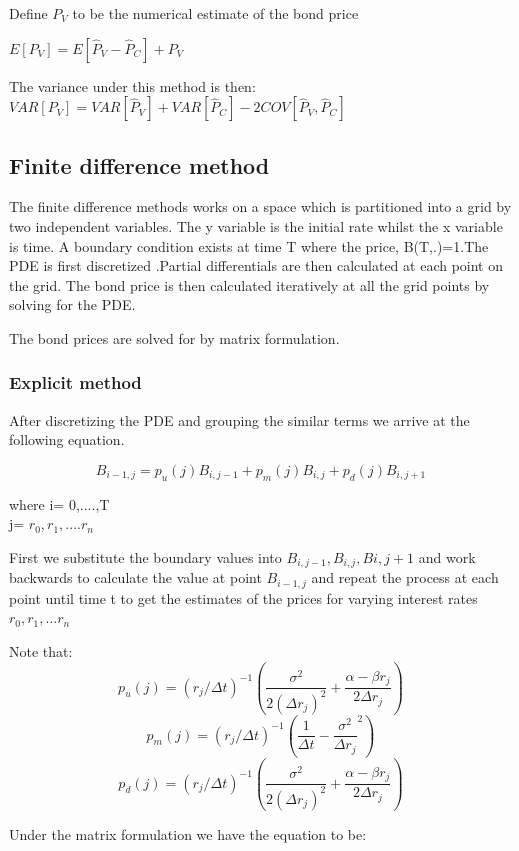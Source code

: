 \documentclass[12pt,a4paper]{article}
\begin{document}
Define $P_{V}$ to be the numerical estimate of the bond price

$E[P_{V}]=E[\hat{P}_{V}-\hat{P}_{C}]+P_{V} $

The variance under this method is then:  
\\$VAR[P_{V}]=VAR[\hat{P}_{V}]+VAR[\hat{P}_{C}]-2COV[\hat{P}_{V},\hat{P}_{C}]$ 


    
\subsection{Finite difference method}

The finite difference methods works on a space which is partitioned into a grid by two independent variables. The y variable is the initial rate whilst the x variable is time. A boundary condition exists at time T where the price, B(T,.)=1.The PDE is first discretized .Partial differentials are then calculated at each point on the grid. The bond price is then calculated iteratively at all the grid points by solving for the PDE.

The bond prices are solved for by matrix formulation.    


\subsubsection{Explicit method}

After discretizing the PDE and grouping the similar terms we arrive at the following equation.  

$$B_{i-1,j}=p_u(j)B_{i,j-1}+p_m(j)B_{i,j}+p_d(j)B_{i,j+1}$$ 

where i= 0,....,T \\
      j= $r_0,r_1,....r_n$
      
First we substitute the boundary values into $B_{i,j-1}, B_{i,j}, B{i,j+1}$ and work backwards to calculate the value at point $B_{i-1,j}$ and repeat the process at each point until time t to get the estimates of the prices for varying interest rates $r_0,r_1,...r_n$ 

Note that:       
$$p_u(j)=(r_j/\Delta t)^{-1}(\frac{\sigma^{2}}{2(\Delta r_j)^{2}}+\frac{\alpha-\beta r_j}{2\Delta r_j})$$
$$p_m(j)=(r_j/\Delta t)^{-1}(\frac{1}{\Delta t}-\frac{\sigma^2}{\Delta r_j}^{2})$$
$$p_d(j)=(r_j/\Delta t)^{-1}(\frac{\sigma^{2}}{2(\Delta r_j)^{2}}+\frac{\alpha-\beta r_j}{2\Delta r_j})$$

Under the matrix formulation we have the equation to be:
\end{document}
